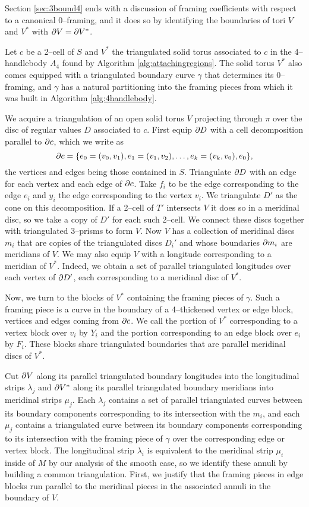 Section \ref{sec:3bound4} ends with a discussion of framing coefficients with respect to a canonical 0--framing, and it does so by identifying the boundaries of tori $V$ and $V^*$ with $\partial V = \partial V^*$.

Let $c$ be a 2--cell of $S$ and $V^*$ the triangulated solid torus associated to $c$ in the 4--handlebody $A_4$ found by Algorithm \ref{alg:attachingregions}.
The solid torus $V^*$ also comes equipped with a triangulated boundary curve $\gamma$ that determines its 0--framing, and $\gamma$ has a natural partitioning into the framing pieces from which it was built in Algorithm \ref{alg:4handlebody}.

We acquire a triangulation of an open solid torus $V$ projecting through $\pi$ over the disc of regular values $D$ associated to $c$.
First equip $\partial D$ with a cell decomposition parallel to $\partial c$, which we write as
\[
	\partial c=\{e_0=(v_0,v_1),e_1=(v_1,v_2),\dots,e_k=(v_k,v_0),e_0\},
\]
the vertices and edges being those contained in $S$.
Triangulate $\partial D$ with an edge for each vertex and each edge of $\partial c$.
Take $f_i$ to be the edge corresponding to the edge $e_i$ and $y_i$ the edge corresponding to the vertex $v_i$.
We triangulate $D'$ as the cone on this decomposition.
If a 2--cell of $T'$ intersects $V$ it does so in a meridinal disc, so we take a copy of $D'$ for each such 2--cell.
We connect these discs together with triangulated 3--prisms to form $V$.
Now $V$ has a collection of meridinal discs $m_i$ that are copies of the triangulated discs $D_i'$ and whose boundaries $\partial m_i$ are meridians of $V$. 
We may also equip $V$ with a longitude corresponding to a meridian of $V^*$.
Indeed, we obtain a set of parallel triangulated longitudes over each vertex of $\partial D'$, each corresponding to a meridinal disc of $V^*$.

Now, we turn to the blocks of $V^*$ containing the framing pieces of $\gamma$.
Such a framing piece is a curve in the boundary of a 4--thickened vertex or edge block, vertices and edges coming from $\partial c$.
We call the portion of $V^*$ corresponding to a vertex block over $v_i$ by $Y_i$ and the portion corresponding to an edge block over $e_i$ by $F_i$.
These blocks share triangulated boundaries that are parallel meridinal discs of $V^*$.

Cut $\partial V$ along its parallel triangulated boundary longitudes into the longitudinal strips $\lambda_j$ and $\partial V^*$ along its parallel triangulated boundary meridians into meridinal strips $\mu_j$.
Each $\lambda_j$ contains a set of parallel triangulated curves between its boundary components corresponding to its intersection with the $m_i$, and each $\mu_j$ contains a triangulated curve between its boundary components corresponding to its intersection with the framing piece of $\gamma$ over the corresponding edge or vertex block.
The longitudinal strip $\lambda_i$ is equivalent to the meridinal strip $\mu_i$ inside of $M$ by our analysis of the smooth case, so we identify these annuli by building a common triangulation.
First, we justify that the framing pieces in edge blocks run parallel to the meridinal  pieces in the associated annuli in the boundary of $V$.


